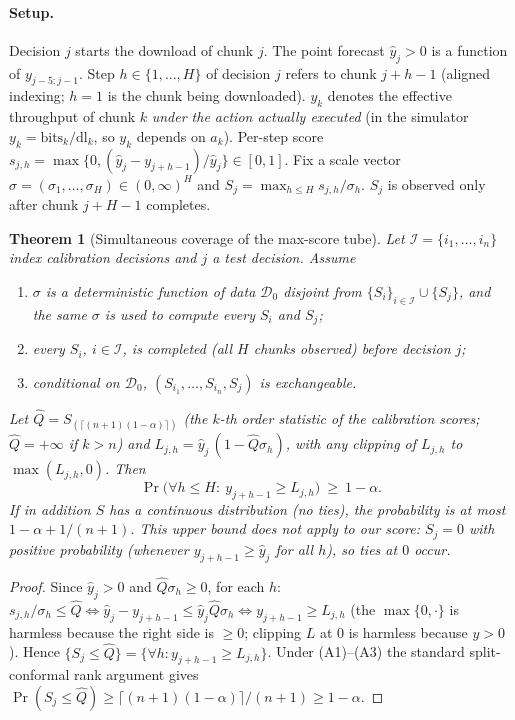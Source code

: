 \newtheorem{theorem}{Theorem}\newtheorem{lemma}{Lemma}\newtheorem{remark}{Remark}

\paragraph{Setup.} Decision $j$ starts the download of chunk $j$. The point forecast
$\hat y_j>0$ is a function of $y_{j-5:j-1}$. Step $h\in\{1,\dots,H\}$ of decision $j$ refers to chunk
$j+h-1$ (aligned indexing; $h=1$ is the chunk being downloaded). $y_k$ denotes the effective throughput
of chunk $k$ \emph{under the action actually executed} (in the simulator $y_k=\mathrm{bits}_k/\mathrm{dl}_k$,
so $y_k$ depends on $a_k$). Per-step score
$s_{j,h}=\max\{0,(\hat y_j-y_{j+h-1})/\hat y_j\}\in[0,1]$.
Fix a scale vector $\sigma=(\sigma_1,\dots,\sigma_H)\in(0,\infty)^H$ and
$S_j=\max_{h\le H} s_{j,h}/\sigma_h$. $S_j$ is observed only after chunk $j+H-1$ completes.

\begin{theorem}[Simultaneous coverage of the max-score tube]\label{thm:maxscore}
Let $\mathcal I=\{i_1,\dots,i_n\}$ index calibration decisions and $j$ a test decision. Assume
\begin{enumerate}
\item[(A1)] $\sigma$ is a deterministic function of data $\mathcal D_0$ disjoint from
 $\{S_i\}_{i\in\mathcal I}\cup\{S_j\}$, and the \emph{same} $\sigma$ is used to compute every $S_i$ and $S_j$;
\item[(A2)] every $S_i$, $i\in\mathcal I$, is completed (all $H$ chunks observed) before decision $j$;
\item[(A3)] conditional on $\mathcal D_0$, $(S_{i_1},\dots,S_{i_n},S_j)$ is exchangeable.
\end{enumerate}
Let $\widehat Q=S_{(\lceil (n+1)(1-\alpha)\rceil)}$ (the $k$-th order statistic of the calibration scores;
$\widehat Q=+\infty$ if $k>n$) and $L_{j,h}=\hat y_j\,(1-\widehat Q\sigma_h)$, with any clipping of
$L_{j,h}$ to $\max(L_{j,h},0)$. Then
\[ \Pr\big(\forall h\le H:\ y_{j+h-1}\ge L_{j,h}\big)\ \ge\ 1-\alpha . \]
If in addition $S$ has a continuous distribution (no ties), the probability is at most
$1-\alpha+1/(n+1)$. \emph{This upper bound does not apply to our score}: $S_j=0$ with positive
probability (whenever $y_{j+h-1}\ge\hat y_j$ for all $h$), so ties at $0$ occur.
\end{theorem}
\begin{proof}
Since $\hat y_j>0$ and $\widehat Q\sigma_h\ge0$, for each $h$:
$s_{j,h}/\sigma_h\le\widehat Q\iff \hat y_j-y_{j+h-1}\le \hat y_j\widehat Q\sigma_h\iff y_{j+h-1}\ge L_{j,h}$
(the $\max\{0,\cdot\}$ is harmless because the right side is $\ge0$; clipping $L$ at $0$ is harmless
because $y>0$). Hence $\{S_j\le\widehat Q\}=\{\forall h: y_{j+h-1}\ge L_{j,h}\}$. Under (A1)--(A3) the
standard split-conformal rank argument gives $\Pr(S_j\le\widehat Q)\ge\lceil (n+1)(1-\alpha)\rceil/(n+1)\ge1-\alpha$.
\end{proof}

